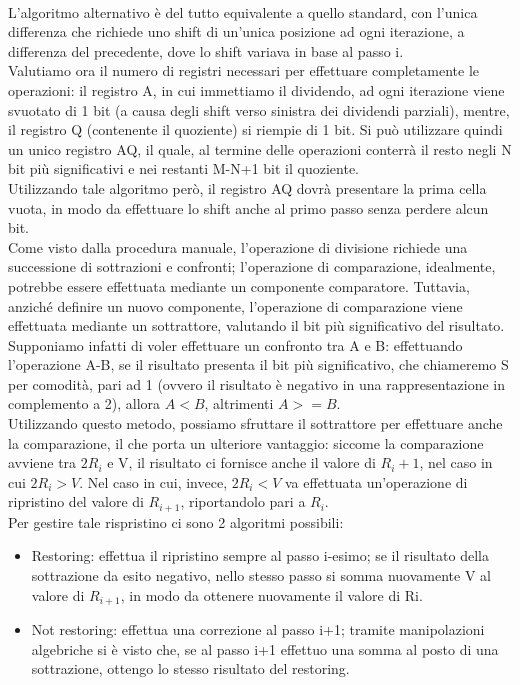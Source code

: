 \documentclass[12pt]{article}
\begin{document}
\\L’algoritmo alternativo è del tutto equivalente a quello standard, con l’unica differenza che richiede uno shift di un’unica posizione ad ogni iterazione, a differenza del precedente, dove lo shift variava in base al passo i.
\\Valutiamo ora il numero di registri necessari per effettuare completamente le operazioni: il registro A, in cui immettiamo il dividendo, ad ogni iterazione viene svuotato di 1 bit (a causa degli shift verso sinistra dei dividendi parziali), mentre, il registro Q (contenente il quoziente) si riempie di 1 bit. Si può utilizzare quindi un unico registro AQ, il quale, al termine delle operazioni conterrà il resto negli N bit più significativi e nei restanti M-N+1 bit il quoziente.
\\Utilizzando tale algoritmo però, il registro AQ dovrà presentare la prima cella vuota, in modo da effettuare lo shift anche al primo passo senza perdere alcun bit.
\\Come visto dalla procedura manuale, l’operazione di divisione richiede una successione di sottrazioni e confronti; l’operazione di comparazione, idealmente, potrebbe essere effettuata mediante un componente comparatore. Tuttavia, anziché definire un nuovo componente, l’operazione di comparazione viene effettuata mediante un sottrattore, valutando il bit più significativo del risultato. Supponiamo infatti di voler effettuare un confronto tra A e B: effettuando l’operazione A-B, se il risultato presenta il bit più significativo, che chiameremo S per comodità, pari ad 1 (ovvero il risultato è negativo in una rappresentazione in complemento a 2), allora $A<B$, altrimenti $A>=B$.
\\Utilizzando questo metodo, possiamo sfruttare il sottrattore per effettuare anche la comparazione, il che porta un ulteriore vantaggio: siccome la comparazione avviene tra $2R_i$ e V, il risultato ci fornisce anche il valore di $R_i+1$, nel caso in cui $2R_i > V$. Nel caso in cui, invece, $2R_i < V$ va effettuata un’operazione di ripristino del valore di $R_{i+1}$, riportandolo pari a $R_i$.
\\Per gestire tale rispristino ci sono 2 algoritmi possibili:
\begin{itemize}
    \item Restoring: effettua il ripristino sempre al passo i-esimo; se il risultato della sottrazione da esito negativo, nello stesso passo si somma nuovamente V al valore di $R_{i+1}$, in modo da ottenere nuovamente il valore di Ri.
    \item Not restoring: effettua una correzione al passo i+1; tramite manipolazioni algebriche si è visto che, se al passo i+1 effettuo una somma al posto di una sottrazione, ottengo lo stesso risultato del restoring.
\end{itemize}
\end{document}

